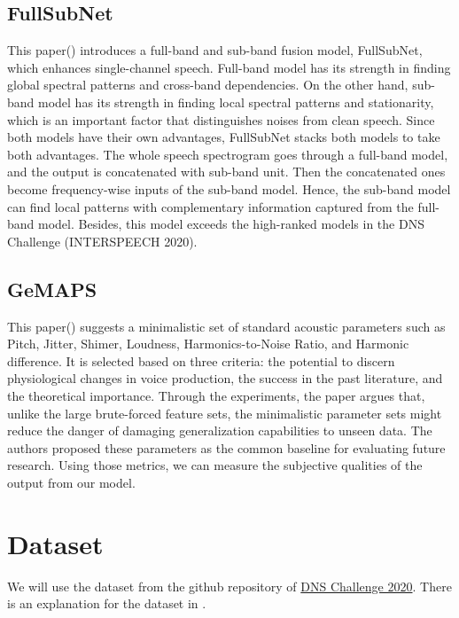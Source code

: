 \documentclass[11pt]{article}
\begin{document}
\subsection{FullSubNet}

This paper(\cite{fullsubnet}) introduces a full-band and sub-band fusion model, FullSubNet, which enhances single-channel speech. Full-band model has its strength in finding global spectral patterns and cross-band dependencies. On the other hand, sub-band model has its strength in finding local spectral patterns and stationarity, which is an important factor that distinguishes noises from clean speech. Since both models have their own advantages, FullSubNet stacks both models to take both advantages. The whole speech spectrogram goes through a full-band model, and the output is concatenated with sub-band unit. Then the concatenated ones become frequency-wise inputs of the sub-band model. Hence, the sub-band model can find local patterns with complementary information captured from the full-band model. Besides, this model exceeds the high-ranked models in the DNS Challenge (INTERSPEECH 2020).

\subsection{GeMAPS}

This paper(\cite{GeMAPS}) suggests a minimalistic set of standard acoustic parameters such as Pitch, Jitter, Shimer, Loudness, Harmonics-to-Noise Ratio, and Harmonic difference. It is selected based on three criteria: the potential to discern physiological changes in voice production, the success in the past literature, and the theoretical importance. Through the experiments, the paper argues that, unlike the large brute-forced feature sets, the minimalistic parameter sets might reduce the danger of damaging generalization capabilities to unseen data. The authors proposed these parameters as the common baseline for evaluating future research. Using those metrics, we can measure the subjective qualities of the output from our model.

\section{Dataset}

We will use the dataset from the github repository of \href{https://github.com/microsoft/DNS-Challenge}{DNS Challenge 2020}. There is an explanation for the dataset in \cite{DNSchallenge2020}. 
\end{document}
